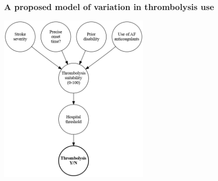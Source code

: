 \begin{frame}
\frametitle{A proposed model of variation in thrombolysis use}

\begin{center}
\includegraphics[width=0.55\textwidth]{./images/thrombolysis_causal}
\end{center}   

\end{frame}